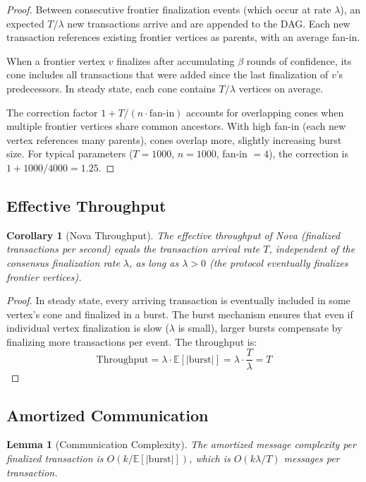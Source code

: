 \documentclass[11pt,a4paper]{article}
\newtheorem{lemma}[theorem]{Lemma}
\newtheorem{corollary}[theorem]{Corollary}
\begin{document}
\begin{proof}
Between consecutive frontier finalization events (which occur at rate $\lambda$), an
expected $T/\lambda$ new transactions arrive and are appended to the DAG. Each new
transaction references existing frontier vertices as parents, with an average fan-in.

When a frontier vertex $v$ finalizes after accumulating $\beta$ rounds of confidence,
its cone includes all transactions that were added since the last finalization of $v$'s
predecessors. In steady state, each cone contains $T/\lambda$ vertices on average.

The correction factor $1 + T/(n \cdot \text{fan-in})$ accounts for overlapping cones
when multiple frontier vertices share common ancestors. With high fan-in (each new
vertex references many parents), cones overlap more, slightly increasing burst size.
For typical parameters ($T = 1000$, $n = 1000$, fan-in $= 4$), the correction is
$1 + 1000/4000 = 1.25$.
\end{proof}

\subsection{Effective Throughput}

\begin{corollary}[Nova Throughput]
\label{cor:throughput}
The effective throughput of Nova (finalized transactions per second) equals the
transaction arrival rate $T$, independent of the consensus finalization rate $\lambda$,
as long as $\lambda > 0$ (the protocol eventually finalizes frontier vertices).
\end{corollary}

\begin{proof}
In steady state, every arriving transaction is eventually included in some vertex's
cone and finalized in a burst. The burst mechanism ensures that even if individual
vertex finalization is slow ($\lambda$ is small), larger bursts compensate by
finalizing more transactions per event. The throughput is:
\[
\text{Throughput} = \lambda \cdot \mathbb{E}[|\text{burst}|] = \lambda \cdot \frac{T}{\lambda} = T
\]
\end{proof}

\subsection{Amortized Communication}

\begin{lemma}[Communication Complexity]
\label{lem:communication}
The amortized message complexity per finalized transaction is $O(k / \mathbb{E}[|\text{burst}|])$,
which is $O(k\lambda/T)$ messages per transaction.
\end{lemma}
\end{document}

